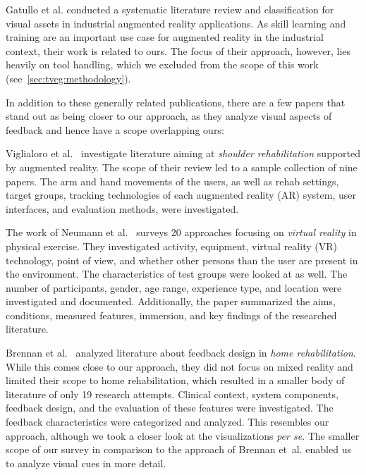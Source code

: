 Gatullo et al.\cite{gatullo2020whw} conducted a systematic literature review and classification for visual assets in industrial augmented reality applications. As skill learning and training are an important use case for augmented reality in the industrial context, their work is related to ours. The focus of their approach, however, lies heavily on tool handling, which we excluded from the scope of this work (see~\autoref{sec:tvcg:methodology}).

In addition to these generally related publications, there are a few papers that stand out as being closer to our approach, as they analyze visual aspects of feedback and hence have a scope overlapping ours:

Viglialoro et al.~\cite{viglialoro2019rar} investigate literature aiming at \emph{shoulder rehabilitation} supported by augmented reality. The scope of their review led to a sample collection of nine papers. The arm and hand movements of the users, as well as rehab settings, target groups, tracking technologies of each augmented reality (AR) system, user interfaces, and evaluation methods, were investigated.

The work of Neumann et al.~\cite{neumann2018sra} surveys 20 approaches focusing on \emph {virtual reality} in physical exercise. They investigated activity, equipment, virtual reality (VR) technology, point of view, and whether other persons than the user are present in the environment. The characteristics of test groups were looked at as well. The number of participants, gender, age range, experience type, and location were investigated and documented. Additionally, the paper summarized the aims, conditions, measured features, immersion, and key findings of the researched literature.

Brennan et al.~\cite{brennan2019fdt} analyzed literature about feedback design in \emph{home rehabilitation}. While this comes close to our approach, they did not focus on mixed reality and limited their scope to home rehabilitation, which resulted in a smaller body of literature of only 19 research attempts. Clinical context, system components, feedback design, and the evaluation of these features were investigated. The feedback characteristics were categorized and analyzed. This resembles our approach, although we took a closer look at the visualizations \emph{per se}. The smaller scope of our survey in comparison to the approach of Brennan et~al. enabled us to analyze visual cues in more detail.


